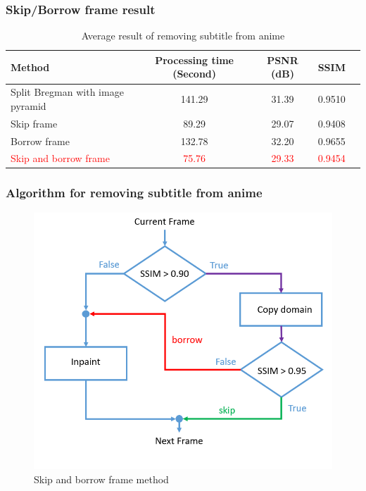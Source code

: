 \documentclass[xcolor=dvipsnames, xetex,serif]{beamer}
\begin{document}
    \begin{frame}
        \frametitle{Skip/Borrow frame result}
        \begin{table}[H]
            \centering
            \begin{tabular}[ht]{|l|c|c|c|c|}
                \hline
                Method  & Processing time  (Second) & PSNR (dB) & SSIM \\
                \hline
                Split Bregman with image pyramid & 141.29 & 31.39  &  0.9510\\
                Skip frame & 89.29 & 29.07 & 0.9408 \\
                Borrow frame & 132.78 & 32.20 & 0.9655\\
                \textcolor{red}{Skip and borrow frame} & \textcolor{red}{75.76} & \textcolor{red}{29.33} & \textcolor{red}{0.9454} \\
                \hline
            \end{tabular}
            \caption{Average result of removing subtitle from anime}
        \end{table}	
    \end{frame}
    \begin{frame}
        \frametitle{Algorithm for removing subtitle from anime}  
        \begin{figure}[H]
            \centering
            \includegraphics[width=0.6\linewidth]{images/skipborrow/flowchart-skipandborrow.png}
            \caption{Skip and borrow frame method}
        \end{figure}        
    \end{frame}
\end{document}
